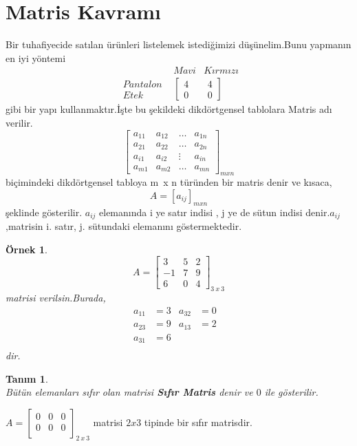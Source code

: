 \documentclass[a4paper,10pt]{book}
\theoremstyle{italik}
\newtheorem{ornek}{Örnek}[chapter]
\newtheorem*{tanim}{Tanım}
\begin{document}
\section{Matris Kavramı}
Bir tuhafiyecide satılan ürünleri listelemek istediğimizi düşünelim.Bunu yapmanın en iyi yöntemi
$$
\begin{array}{lcr}
	\quad & Mavi & Kırmızı \\
	\begin{array}{l} 
		Pantalon \\
		Etek 
	\end{array} & \left[
				\begin{array}{r}
					4 \\
					0
				\end{array}
		      \right. & \left.\begin{array}{l} 4 \\ 0 \end{array}\right]
\end{array}
$$
gibi bir yapı kullanmaktır.İşte bu şekildeki dikdörtgensel tablolara Matris adı verilir.
$$
\left[
\begin{array}{cccc}
	a_{11} & a_{12} & \ldots & a_{1n} \\
	a_{21} & a_{22} & \ldots & a_{2n} \\
	a_{i1} & a_{i2} & \vdots & a_{in} \\
	a_{m1} & a_{m2} & \ldots & a_{mn} 
\end{array}\right]_{mxn}
$$
biçimindeki dikdörtgensel tabloya m\ x n türünden bir matris denir ve kısaca,
$$
A=\left[a_{ij}\right]_{mxn}
$$
şeklinde gösterilir.
$ a_{ij} $ elemanında i ye satır indisi , j ye de  sütun indisi denir.$ a_{ij} $,matrisin i. satır, j. sütundaki elemanını göstermektedir.
\begin{ornek}
	$$
	A=\left[
	\begin{array}{cccc}
		3 & 5 & 2 \\
		-1 & 7 & 9 \\
		6 & 0 & 4 
	\end{array}
	\right]_{3\ x\ 3}
	$$
	matrisi verilsin.Burada,
	\begin{align*}
		a_{11}&=3 & a_{32}&=0 \\
		a_{23}&=9 & a_{13}&=2 \\
		a_{31}&=6 & & & \\
	\end{align*}
	dir.
\end{ornek}
\begin{tanim}
	\quad \\
	Bütün elemanları sıfır olan matrisi \textsl{\textbf{Sıfır Matris}} denir ve $0$ ile gösterilir.
\end{tanim}
$
A=\left[
\begin{array}{ccc}
	0 & 0 & 0 \\
	0 & 0 & 0 \\
\end{array}
\right]_{2\ x\ 3}
$
matrisi $2x3$ tipinde bir sıfır matrisdir.
\end{document}
